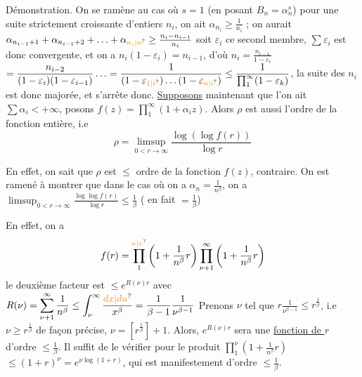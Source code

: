 Démonstration. On se ramène au cas où $s=1$
(en posant $B_n=\alpha_n^s$)   pour une suite
strictement croissante d'entiers $n_i$, on  ait
$\alpha_{n_i}\geq\frac1{n_i}$ ;  on aurait \quad $\alpha_{n_{i-1}+1}+\alpha_{n_{i-1}+2}+\ldots+\alpha_{\unsure{n_i|n}}\geq\frac{n_i-n_{i-1}}{n_i}$
soit $\varepsilon_i$ ce second membre, $\sum\varepsilon_i$ est donc
convergente, et on a $n_i(1-\varepsilon_i)=n_{i-1}$, d'où $n_i=\frac{n_{i-1}}{1-\varepsilon_i}$
$\displaystyle =\frac{n_{i-2}}{(1-\varepsilon_i)(1-\varepsilon_{i-1})}\ldots=\frac1{(1-\varepsilon_{\unsure{1|i}})\ldots(1-\varepsilon_{\unsure{n|i}})}\leq\frac1{\prod_1^\infty(1-\varepsilon_k)}$, la suite
des $n_i$ est donc majorée, et s'arrête donc.
\uline{Supposons} maintenant que l'on ait $\sum\alpha_i<+\infty$,
posons $f(z)=\prod_1^\infty(1+\alpha_i z)$. Alors $\rho$ est aussi
l'ordre de la fonction entière, i.e
\[ \rho=\limsup_{0<r\to\infty}\frac{\log(\log f(r))}{\log r} \]

En effet, on sait que $\rho$ est $\leq$ ordre de la
fonction $f(z)$,    contraire. On est
ramené à montrer que  dans le
cas où on a $\alpha_n=\frac1{n^\beta}$, on a
$\displaystyle \limsup_{0<r\to\infty}\frac{\log\log f(r)}{\log r}\leq\frac1\beta$ \quad ( en fait $=\frac1\beta$)

En effet, on a
\[ f(r)=\prod_1^{\unsure{\nu|v}}\left(1+\frac1{n^\beta}r\right)\prod_{\nu+1}^{\infty}\left(1+\frac1{n^\beta}r\right) \]
le deuxième facteur est $\leq e^{R(\nu)r}$
avec $\displaystyle R(\nu)=\sum_{\nu+1}^\infty\frac1{n^\beta}\leq\int_\nu^\infty\frac{\unsure{dx|du}}{x^\beta}=\frac1{\beta-1}\frac1{\nu^{\beta-1}}$
Prenons $\nu$ tel que $r\frac1{\nu^{\beta-1}}\leq r^{\frac1\beta}$, i.e $\nu\geq r^{\frac1\beta}$
de façon précise, $\nu=[r^{\frac1\beta}]+1$. Alors, $e^{R(\nu)r}$
sera une \uline{fonction de $r$} d'ordre $\leq\frac1\beta$. Il
suffit de le vérifier pour le produit $\prod_1^\nu(1+\frac1{n^\beta}r)$
$\leq(1+r)^\nu=e^{\nu\log(1+r)}$, qui est manifestement
d'ordre $\leq\frac1\beta$.

